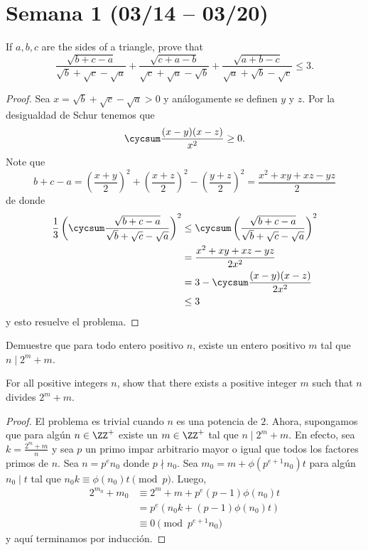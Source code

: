 \section{Semana 1 (03/14 -- 03/20)}


\begin{probEG}
	If $a,b,c$ are the sides of a triangle, prove that
	\[\frac{\sqrt{b+c-a}}{\sqrt b+\sqrt c-\sqrt a}+\frac{\sqrt{c+a-b}}{\sqrt c+\sqrt a-\sqrt b}+\frac{\sqrt{a+b-c}}{\sqrt a+\sqrt b-\sqrt c}\le 3.\]
\end{probEG}

\begin{proof}
	Sea $x=\sqrt b+\sqrt c-\sqrt a>0$ y análogamente se definen $y$ y $z$. Por la desigualdad de Schur tenemos que
	\[\cycsum\frac{(x-y)(x-z)}{x^2}\ge 0.\]
	Note que
	\[b+c-a=\left(\frac{x+y}{2}\right)^2+\left(\frac{x+z}{2}\right)^2-\left(\frac{y+z}{2}\right)^2=\frac{x^2+xy+xz-yz}{2}\]
	de donde
	\begin{align*}
		\frac13\left(\cycsum\frac{\sqrt{b+c-a}}{\sqrt b+\sqrt c-\sqrt a}\right)^2
		&\le\cycsum\left(\frac{\sqrt{b+c-a}}{\sqrt b+\sqrt c-\sqrt a}\right)^2\\
		&=\frac{x^2+xy+xz-yz}{2x^2}\\
		&=3-\cycsum\frac{(x-y)(x-z)}{2x^2}\\
		&\le 3
	\end{align*}
	y esto resuelve el problema.
\end{proof}

\begin{probEB}
	Demuestre que para todo entero positivo $n$, existe un entero positivo $m$ tal que $n\mid 2^m+m$.
	\begin{hint}
		For all positive integers $n$, show that there exists a positive integer $m$ such that $n$ divides $2^m+m$.
	\end{hint}
\end{probEB}

\begin{proof}
	El problema es trivial cuando $n$ es una potencia de $2$. Ahora, supongamos que para algún $n\in\ZZ^+$ existe un $m\in\ZZ^+$ tal que $n\mid 2^m+m$. En efecto, sea $k=\frac{2^m+m}{n}$ y sea $p$ un primo impar arbitrario mayor o igual que todos los factores primos de $n$. Sea $n=p^en_0$ donde $p\nmid n_0$. Sea $m_0=m+\phi(p^{e+1}n_0)t$ para algún $n_0\mid t$ tal que $n_0k\equiv\phi(n_0)t\pmod p$. Luego,
	\begin{align*}
		2^{m_0}+m_0
		&\equiv 2^m+m+p^e(p-1)\phi(n_0)t\\
		&=p^e\left(n_0k+(p-1)\phi(n_0)t\right)\\
		&\equiv 0\pmod{p^{e+1}n_0}
	\end{align*}
	y aquí terminamos por inducción.
\end{proof}

